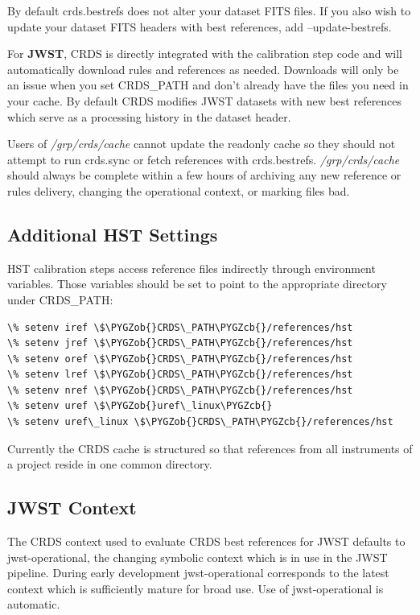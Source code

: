 \documentclass[letterpaper,10pt,english]{sphinxmanual}
\def\PYGZob{\char`\{}
\def\PYGZcb{\char`\}}
\begin{document}
By default crds.bestrefs does not alter your dataset FITS files.   If you also wish to update your dataset FITS
headers with best references,  add --update-bestrefs.

For \textbf{JWST},  CRDS is directly integrated with the calibration step code and will automatically download
rules and references as needed.   Downloads will only be an issue when you set CRDS\_PATH and don't already
have the files you need in your cache.   By default CRDS modifies JWST datasets with new best references
which serve as a processing history in the dataset header.

Users of \emph{/grp/crds/cache} cannot update the readonly cache so they should not attempt to run crds.sync or
fetch references with crds.bestrefs.  \emph{/grp/crds/cache} should always be complete within a few hours of archiving
any new reference or rules delivery,  changing the operational context,  or marking files bad.


\subsection{Additional HST Settings}
\label{installation:additional-hst-settings}
HST calibration steps access reference files indirectly through environment variables.  Those variables
should be set to point to the appropriate directory under CRDS\_PATH:

\begin{Verbatim}[commandchars=\\\{\}]
\% setenv iref \$\PYGZob{}CRDS\_PATH\PYGZcb{}/references/hst
\% setenv jref \$\PYGZob{}CRDS\_PATH\PYGZcb{}/references/hst
\% setenv oref \$\PYGZob{}CRDS\_PATH\PYGZcb{}/references/hst
\% setenv lref \$\PYGZob{}CRDS\_PATH\PYGZcb{}/references/hst
\% setenv nref \$\PYGZob{}CRDS\_PATH\PYGZcb{}/references/hst
\% setenv uref \$\PYGZob{}uref\_linux\PYGZcb{}
\% setenv uref\_linux \$\PYGZob{}CRDS\_PATH\PYGZcb{}/references/hst
\end{Verbatim}

Currently the CRDS cache is structured so that references from all instruments of a project reside in one common
directory.


\subsection{JWST Context}
\label{installation:jwst-context}
The CRDS context used to evaluate CRDS best references for JWST defaults to jwst-operational,  the changing
symbolic context which is in use in the JWST pipeline.  During early development jwst-operational corresponds
to the latest context which is sufficiently mature for broad use.  Use of jwst-operational is automatic.
\end{document}
